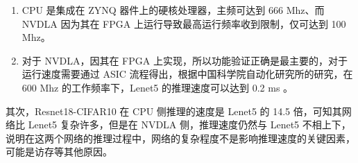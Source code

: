 \begin{enumerate}
    \item CPU 是集成在 ZYNQ 器件上的硬核处理器，主频可达到 666 Mhz、而 NVDLA 因为其在 FPGA 上运行导致最高运行频率收到限制，仅可达到 100 Mhz。
    \item 对于 NVDLA，因其在 FPGA 上实现，所以功能验证正确是最主要的，对于运行速度需要通过 ASIC 流程得出，根据中国科学院自动化研究所的研究，在 600 Mhz 的工作频率下，Lenet5 的推理速度可以达到 0.2 ms \cite{9040769}。 
\end{enumerate}

其次，Resnet18-CIFAR10 在 CPU 侧推理的速度是 Lenet5 的 14.5 倍，可知其网络比 Lenet5 复杂许多，但是在 NVDLA 侧，推理速度仍然与 Lenet5 不相上下，说明在这两个网络的推理过程中，网络的复杂程度不是影响推理速度的关键因素，可能是访存等其他原因。